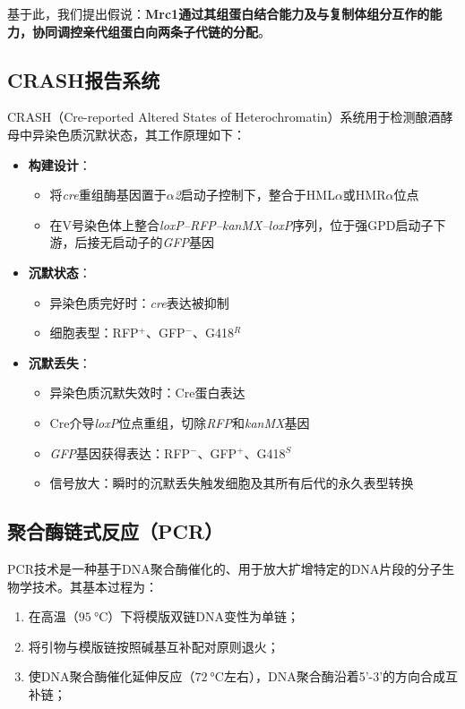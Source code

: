 \documentclass[a4,10pt]{article}
\begin{document}
基于此，我们提出假说：\textbf{Mrc1通过其组蛋白结合能力及与复制体组分互作的能力，协同调控亲代组蛋白向两条子代链的分配}。

\subsection{CRASH报告系统}

CRASH（Cre-reported Altered States of Heterochromatin）系统用于检测酿酒酵母中异染色质沉默状态，其工作原理如下：

\begin{itemize}
    \item \textbf{构建设计}：
    \begin{itemize}
        \item 将\textit{cre}重组酶基因置于$\alpha$\textit{2}启动子控制下，整合于HML$\alpha$或HMR$\alpha$位点
        \item 在V号染色体上整合\textit{loxP--RFP--kanMX--loxP}序列，位于强GPD启动子下游，后接无启动子的\textit{GFP}基因
    \end{itemize}
    
    \item \textbf{沉默状态}：
    \begin{itemize}
        \item 异染色质完好时：\textit{cre}表达被抑制
        \item 细胞表型：RFP$^+$、GFP$^-$、G418$^R$
    \end{itemize}
    
    \item \textbf{沉默丢失}：
    \begin{itemize}
        \item 异染色质沉默失效时：Cre蛋白表达
        \item Cre介导\textit{loxP}位点重组，切除\textit{RFP}和\textit{kanMX}基因
        \item \textit{GFP}基因获得表达：RFP$^-$、GFP$^+$、G418$^S$
        \item 信号放大：瞬时的沉默丢失触发细胞及其所有后代的永久表型转换
    \end{itemize}
\end{itemize}

\subsection{聚合酶链式反应（PCR）}

PCR技术是一种基于DNA聚合酶催化的、用于放大扩增特定的DNA片段的分子生物学技术。其基本过程为：
\begin{enumerate}
    \item 在高温（$\qty{95}{\celsius}$）下将模版双链DNA变性为单链；
    \item 将引物与模版链按照碱基互补配对原则退火；
    \item 使DNA聚合酶催化延伸反应（$\qty{72}{\celsius}$左右），DNA聚合酶沿着5'-3'的方向合成互补链；
\end{enumerate}
\end{document}
